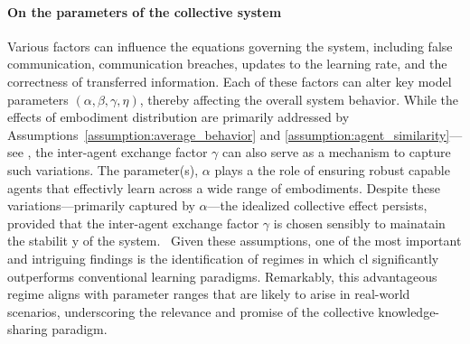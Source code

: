 \documentclass[12pt]{article}
\begin{document}
\paragraph*{On the parameters of the collective system}
Various factors can influence the equations governing the system, including false communication, communication breaches, updates to the learning rate, and the correctness of transferred information. Each of these factors can alter key model parameters $(\alpha, \beta, \gamma, \eta)$, thereby affecting the overall system behavior. While the effects of embodiment distribution are primarily addressed by Assumptions~\ref{assumption:average_behavior} and \ref{assumption:agent_similarity}---see , the inter-agent exchange factor $\gamma$ can also serve as a mechanism to capture such variations. The parameter(s), $\alpha$ plays a the role of ensuring robust capable agents that effectivly learn across a wide range of embodiments. Despite these variations—primarily captured by $\alpha$---the idealized collective effect persists, provided that the inter-agent exchange factor $\gamma$ is chosen sensibly to mainatain the stabilit y of the system.%
~Given these assumptions, one of the most important and intriguing findings is the identification of regimes in which \ac{cl} significantly outperforms conventional learning paradigms. Remarkably, this advantageous regime aligns with parameter ranges that are likely to arise in real-world scenarios, underscoring the relevance and promise of the collective knowledge-sharing paradigm.

\end{document}
